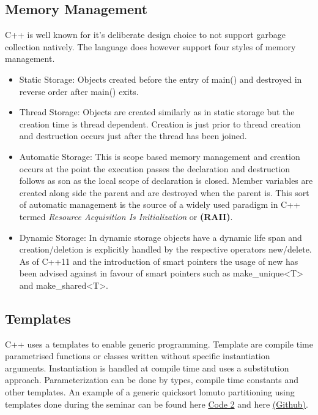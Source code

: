 \documentclass[conference, a4paper]{IEEEtran}
\begin{document}
\subsection{Memory Management}

C++ is well known for it's deliberate design choice to not support garbage collection natively. The language does however support four styles of memory management. 

\begin{itemize}
    \item Static Storage: Objects created before the entry of main() and destroyed in reverse order after main() exits.
    \item Thread Storage:  Objects are created similarly as in static storage but the creation time is thread dependent. Creation is just prior to thread creation and destruction occurs just after the thread has been joined. 
    \item Automatic Storage: This is scope based memory management and creation occurs at the point the execution passes the declaration and destruction follows as son as the local scope of declaration is closed. Member variables are created along side the parent and are destroyed when the parent is. This sort of automatic management is the source of a widely used paradigm in C++ termed \textit{Resource Acquisition Is Initialization} or \textbf{(RAII)}.
    \item Dynamic Storage: In dynamic storage objects have a dynamic life span and creation/deletion is explicitly handled by the respective operators new/delete. As of C++11 and the introduction of smart pointers the usage of new has been advised against in favour of smart pointers such as make\_unique<T> and make\_shared<T>.

\end{itemize}

\subsection{Templates}

C++ uses a templates to enable generic programming. Template are compile time parametrised functions or classes written without specific instantiation arguments. Instantiation is handled at compile time and uses a substitution approach. Parameterization can be done by types, compile time constants and other templates. An example of a generic quicksort lomuto partitioning using templates done during the seminar can be found here \hyperref[listing:2]{Code 2} and here \href{https://github.com/qasimwarraich/PLP/blob/master/A2/Task1/quicksort/quicksort.cpp}{(Github)}.
\end{document}
